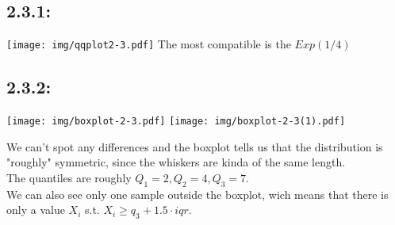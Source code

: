 \documentclass{article}
\begin{document}
\subsection*{2.3.1:}
\texttt{[image: img/qqplot2-3.pdf]}
The most compatible is the $Exp(1/4)$
\subsection*{2.3.2:}
\begin{center}
    \texttt{[image: img/boxplot-2-3.pdf]}
    \texttt{[image: img/boxplot-2-3(1).pdf]}
\end{center}
We can't spot any differences and the boxplot tells us that the distribution is "roughly" symmetric, since the whiskers are kinda of the same length.\\
The quantiles are roughly $Q_1=2,Q_2=4,Q_3=7$.\\
We can also see only one sample outside the boxplot, wich means that there is only a value $X_i$ s.t. $X_i\geq q_3+1.5\cdot iqr$.
\end{document}
